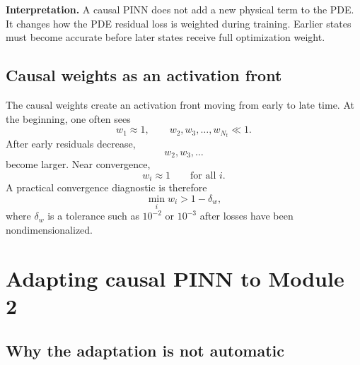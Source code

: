 \documentclass[11pt]{article}
\begin{document}
\begin{physicsbox}
\textbf{Interpretation.} A causal PINN does not add a new physical term to the PDE. It changes how the PDE residual loss is weighted during training. Earlier states must become accurate before later states receive full optimization weight.
\end{physicsbox}

\subsection{Causal weights as an activation front}

The causal weights create an activation front moving from early to late time. At the beginning, one often sees
\begin{equation}
w_1\approx 1,
\qquad
w_2,w_3,\ldots,w_{N_t}\ll 1.
\end{equation}
After early residuals decrease,
\begin{equation}
w_2,w_3,\ldots
\end{equation}
become larger. Near convergence,
\begin{equation}
w_i\approx 1\qquad\text{for all }i.
\end{equation}
A practical convergence diagnostic is therefore
\begin{equation}
\min_i w_i>1-\delta_w,
\label{eq:causal_weight_stopping}
\end{equation}
where $\delta_w$ is a tolerance such as $10^{-2}$ or $10^{-3}$ after losses have been nondimensionalized.

\section{Adapting causal PINN to Module 2}

\subsection{Why the adaptation is not automatic}
\end{document}
